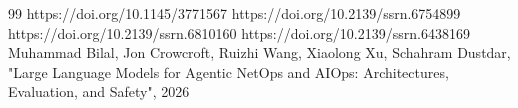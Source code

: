 \documentclass[conference]{IEEEtran}
\begin{document}
\begin{thebibliography}{99}
 https://doi.org/10.1145/3771567
 https://doi.org/10.2139/ssrn.6754899
 https://doi.org/10.2139/ssrn.6810160
 https://doi.org/10.2139/ssrn.6438169
 Muhammad Bilal, Jon Crowcroft, Ruizhi Wang, Xiaolong Xu, Schahram Dustdar, "Large Language Models for Agentic NetOps and AIOps: Architectures, Evaluation, and Safety", 2026
\end{thebibliography}
\end{document}
